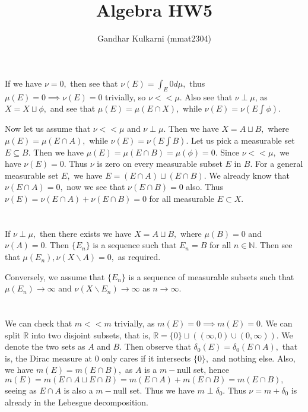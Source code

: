 \documentclass{article}
\title{Algebra HW5} %
\author{Gandhar Kulkarni (mmat2304)} %
\date{} %
\begin{document}
\maketitle %


\section{} %
If we have $\nu=0,$ then see that $\nu(E)=\int_{E}0 d\mu,$ thus $\mu(E)=0 \implies \nu(E)=0$ trivially, so $\nu << \mu.$ Also see that $\nu \perp \mu$, as 
$X= X \sqcup \phi,$ and see that $\mu(E)=\mu(E \cap X),$ while $\nu(E)=\nu(E \int \phi).$ 

Now let us assume that $\nu << \mu$ and $\nu \perp \mu.$ Then we have $X=A \sqcup B,$ where $\mu(E)=\mu(E \cap A),$ while $\nu(E)=\nu(E \int B).$ Let us 
pick a measurable set $E \subseteq B.$ Then we have $\mu(E)=\mu(E \cap B)=\mu(\phi)=0.$ Since $\nu << \mu,$ we have $\nu(E)=0.$ Thus $\nu$ is zero on every 
measurable subset $E$ in $B.$ For a general measurable set $E,$ we have $E=(E \cap A) \sqcup (E \cap B).$ We already know that $\nu(E\cap A)=0,$ now we see 
that $\nu(E \cap B)=0$ also. Thus $\nu(E)=\nu(E \cap A)+\nu(E \cap B)=0$ for all measurable $E \subset X.$
\section{} %
If $\nu \perp \mu,$ then there exists we have $X=A \sqcup B,$ where $\mu(B)=0$ and $\nu(A)=0.$ Then $\{E_n\}$ is a sequence such that $E_n=B$ for all $n \in 
\mathbb{N}.$ Then see that $\mu(E_n), \nu(X\backslash A)=0,$ as required.

Conversely, we assume that $\{E_n\}$ is a sequence of measurable subsets such that $\mu(E_n)\to \infty$ and $\nu(X \backslash E_n) \to \infty$ as $n \to 
\infty.$ 
\section{} %
We can check that $m << m$ trivially, as $m(E)=0 \implies m(E)=0.$ We can split $\mathbb{R}$ into two disjoint subsets, that is, $\mathbb{R}= \{0\} \sqcup 
((\infty,0)\cup (0,\infty)).$ We denote the two sets as $A$ and $B.$ Then observe that $\delta_0(E)= \delta_0(E \cap A),$ that is, the Dirac measure at $0$ 
only cares if it intersects $\{0\},$ and nothing else. Also, we have $m(E)=m(E \cap B),$ as $A$ is a $m-$null set, hence $m(E)=m(E\cap A \sqcup E \cap 
B)=m(E \cap A)+ m(E \cap B)=m(E \cap B),$ seeing as $E \cap A$ is also a $m-$null set. Thus we have $m \perp \delta_0.$ Thus $\nu=m+\delta_0$ is already in 
the Lebesgue decomposition. 
\end{document}
